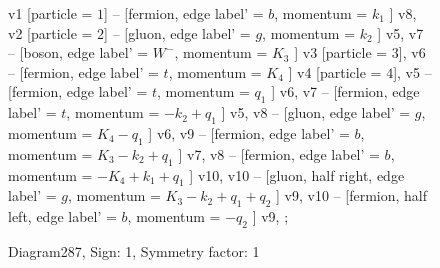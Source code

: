 \documentclass{revtex4}
\begin{document}
\begin{figure}[!htb]
\begin{center}
{    %
v1 [particle = \(1\)] -- [fermion, edge label' = \(b\), momentum = \(k_{1}\) ] v8, 
v2 [particle = \(2\)] -- [gluon, edge label' = \(g\), momentum = \(k_{2}\) ] v5, 
v7 -- [boson, edge label' = \(W^{-}\), momentum = \(K_{3}\) ] v3 [particle = \(3\)], 
v6 -- [fermion, edge label' = \(t\), momentum = \(K_{4}\) ] v4 [particle = \(4\)], 
v5 -- [fermion, edge label' = \(t\), momentum = \(q_{1}\) ] v6, 
v7 -- [fermion, edge label' = \(t\), momentum = \(-k_{2} + q_{1}\) ] v5, 
v8 -- [gluon, edge label' = \(g\), momentum = \(K_{4} - q_{1}\) ] v6, 
v9 -- [fermion, edge label' = \(b\), momentum = \(K_{3} - k_{2} + q_{1}\) ] v7, 
v8 -- [fermion, edge label' = \(b\), momentum = \(-K_{4} + k_{1} + q_{1}\) ] v10, 
v10 -- [gluon, half right, edge label' = \(g\), momentum = \(K_{3} - k_{2} + q_{1} + q_{2}\) ] v9, 
v10 -- [fermion, half left, edge label' = \(b\), momentum = \(-q_{2}\) ] v9, 
};
\end{center}
\caption{Diagram287, Sign: 1, Symmetry factor: 1}
\end{figure}
\newpage
\end{document}
